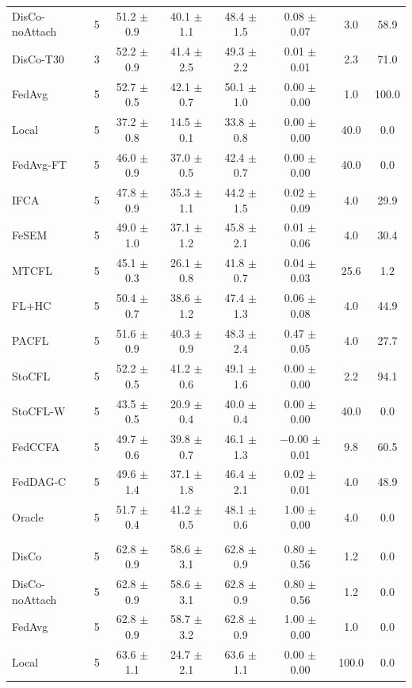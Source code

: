{{\begin{tabular}{l r c c c c c c}
DisCo-noAttach & 5 & 51.2 $\pm$ 0.9 & 40.1 $\pm$ 1.1 & 48.4 $\pm$ 1.5 & 0.08 $\pm$ 0.07 & 3.0 & 58.9 \\
DisCo-T30 & 3 & 52.2 $\pm$ 0.9 & 41.4 $\pm$ 2.5 & 49.3 $\pm$ 2.2 & 0.01 $\pm$ 0.01 & 2.3 & 71.0 \\
FedAvg & 5 & 52.7 $\pm$ 0.5 & 42.1 $\pm$ 0.7 & 50.1 $\pm$ 1.0 & 0.00 $\pm$ 0.00 & 1.0 & 100.0 \\
Local & 5 & 37.2 $\pm$ 0.8 & 14.5 $\pm$ 0.1 & 33.8 $\pm$ 0.8 & 0.00 $\pm$ 0.00 & 40.0 & 0.0 \\
FedAvg-FT & 5 & 46.0 $\pm$ 0.9 & 37.0 $\pm$ 0.5 & 42.4 $\pm$ 0.7 & 0.00 $\pm$ 0.00 & 40.0 & 0.0 \\
IFCA & 5 & 47.8 $\pm$ 0.9 & 35.3 $\pm$ 1.1 & 44.2 $\pm$ 1.5 & 0.02 $\pm$ 0.09 & 4.0 & 29.9 \\
FeSEM & 5 & 49.0 $\pm$ 1.0 & 37.1 $\pm$ 1.2 & 45.8 $\pm$ 2.1 & 0.01 $\pm$ 0.06 & 4.0 & 30.4 \\
MTCFL & 5 & 45.1 $\pm$ 0.3 & 26.1 $\pm$ 0.8 & 41.8 $\pm$ 0.7 & 0.04 $\pm$ 0.03 & 25.6 & 1.2 \\
FL+HC & 5 & 50.4 $\pm$ 0.7 & 38.6 $\pm$ 1.2 & 47.4 $\pm$ 1.3 & 0.06 $\pm$ 0.08 & 4.0 & 44.9 \\
PACFL & 5 & 51.6 $\pm$ 0.9 & 40.3 $\pm$ 0.9 & 48.3 $\pm$ 2.4 & 0.47 $\pm$ 0.05 & 4.0 & 27.7 \\
StoCFL & 5 & 52.2 $\pm$ 0.5 & 41.2 $\pm$ 0.6 & 49.1 $\pm$ 1.6 & 0.00 $\pm$ 0.00 & 2.2 & 94.1 \\
StoCFL-W & 5 & 43.5 $\pm$ 0.5 & 20.9 $\pm$ 0.4 & 40.0 $\pm$ 0.4 & 0.00 $\pm$ 0.00 & 40.0 & 0.0 \\
FedCCFA & 5 & 49.7 $\pm$ 0.6 & 39.8 $\pm$ 0.7 & 46.1 $\pm$ 1.3 & $-$0.00 $\pm$ 0.01 & 9.8 & 60.5 \\
FedDAG-C & 5 & 49.6 $\pm$ 1.4 & 37.1 $\pm$ 1.8 & 46.4 $\pm$ 2.1 & 0.02 $\pm$ 0.01 & 4.0 & 48.9 \\
Oracle & 5 & 51.7 $\pm$ 0.4 & 41.2 $\pm$ 0.5 & 48.1 $\pm$ 0.6 & 1.00 $\pm$ 0.00 & 4.0 & 0.0 \\
\addlinespace
\multicolumn{8}{l}{\textit{FEMNIST}} \\
DisCo & 5 & 62.8 $\pm$ 0.9 & 58.6 $\pm$ 3.1 & 62.8 $\pm$ 0.9 & 0.80 $\pm$ 0.56 & 1.2 & 0.0 \\
DisCo-noAttach & 5 & 62.8 $\pm$ 0.9 & 58.6 $\pm$ 3.1 & 62.8 $\pm$ 0.9 & 0.80 $\pm$ 0.56 & 1.2 & 0.0 \\
FedAvg & 5 & 62.8 $\pm$ 0.9 & 58.7 $\pm$ 3.2 & 62.8 $\pm$ 0.9 & 1.00 $\pm$ 0.00 & 1.0 & 0.0 \\
Local & 5 & 63.6 $\pm$ 1.1 & 24.7 $\pm$ 2.1 & 63.6 $\pm$ 1.1 & 0.00 $\pm$ 0.00 & 100.0 & 0.0 \\

\end{tabular}}}
